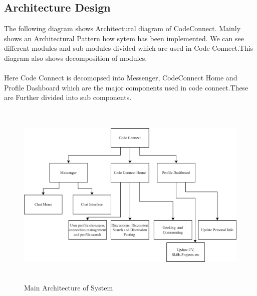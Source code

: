 \subsection{Architecture Design}
The following diagram shows Architectural diagram of CodeConnect. Mainly shows an Architectural Pattern how sytem has been implemented. We can see different modules and sub modules divided which are used in Code Connect.This diagram also shows decomposition of modules.
\\\\
Here Code Connect is decomopsed into Messenger, CodeConnect Home and Profile Dashboard which are the major components used in code connect.These are Further divided into sub components.
\begin{figure}[H]
    \includegraphics[height = 9cm]{Diagrams/Main_Block.png}
    \caption{Main Architecture of System}
\end{figure}
\newpage
